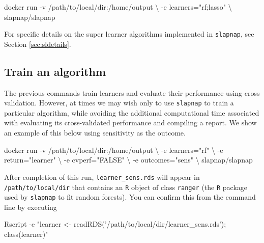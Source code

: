 \documentclass[]{article}
\newenvironment{Shaded}{\begin{snugshade}}{\end{snugshade}}
\newcommand{\StringTok}[1]{\textcolor[rgb]{0.31,0.60,0.02}{#1}}
\newcommand{\ExtensionTok}[1]{#1}
\newcommand{\NormalTok}[1]{#1}
\begin{document}
\begin{Shaded}
\begin{Highlighting}[]
\ExtensionTok{docker}\NormalTok{ run -v /path/to/local/dir:/home/output \textbackslash{}}
\NormalTok{           -e learners=}\StringTok{"rf;lasso"}\NormalTok{ \textbackslash{}}
\NormalTok{           slapnap/slapnap}
\end{Highlighting}
\end{Shaded}

For specific details on the super learner algorithms implemented in
\texttt{slapnap}, see Section \ref{sec:sldetails}.

\subsection{Train an algorithm}\label{train-an-algorithm}

The previous commands train learners and evaluate their performance
using cross validation. However, at times we may wish only to use
\texttt{slapnap} to train a particular algorithm, while avoiding the
additional computational time associated with evaluating its
cross-validated performance and compiling a report. We show an example
of this below using sensitivity as the outcome.

\begin{Shaded}
\begin{Highlighting}[]
\ExtensionTok{docker}\NormalTok{ run -v /path/to/local/dir:/home/output \textbackslash{}}
\NormalTok{           -e learners=}\StringTok{"rf"}\NormalTok{ \textbackslash{}}
\NormalTok{           -e return=}\StringTok{"learner"}\NormalTok{ \textbackslash{}}
\NormalTok{           -e cvperf=}\StringTok{"FALSE"}\NormalTok{ \textbackslash{}}
\NormalTok{           -e outcomes=}\StringTok{"sens"}\NormalTok{ \textbackslash{}}
\NormalTok{           slapnap/slapnap}
\end{Highlighting}
\end{Shaded}

After completion of this run, \texttt{learner\_sens.rds} will appear in
\texttt{/path/to/local/dir} that contains an \texttt{R} object of class
\texttt{ranger} (the \texttt{R} package used by \texttt{slapnap} to fit
random forests). You can confirm this from the command line by executing

\begin{Shaded}
\begin{Highlighting}[]
\ExtensionTok{Rscript}\NormalTok{ -e }\StringTok{"learner <- readRDS('/path/to/local/dir/learner_sens.rds'); class(learner)"}
\end{Highlighting}
\end{Shaded}
\end{document}
